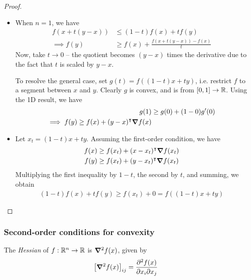 \documentclass{../../template/note}
\begin{document}
    \begin{proof}
        \begin{itemize}
            \item[$\implies$] When $n=1$, we have
            \begin{align*}
                f(x + t(y-x)) &\leq (1-t)f(x) + tf(y) \\
                \implies f(y) &\geq f(x) + \frac{f(x+t(y-x))-f(x)}{t}
            \end{align*}
            Now, take $t \to 0$ -- the quotient becomes $(y-x)$ times the derivative due to the fact that $t$ is scaled by $y-x$.

            To resolve the general case, set $g(t) = f((1-t)x+ty)$, i.e. restrict $f$ to a segment between $x$ and $y$. Clearly $g$ is convex, and is from $[0, 1] \to \mathbb R$. Using the 1D result, we have
            \begin{align*}
                g(1) &\geq g(0) + (1-0)g'(0) \\
                \implies f(y) \geq f(x) + (y-x)^\intercal \grad f(x)
            \end{align*}
            \item[$\impliedby$] Let $x_t = (1-t)x + ty$. Assuming the first-order condition, we have
            \begin{align*}
                f(x) &\geq f(x_t) + (x-x_t)^\intercal \grad f(x_t) \\
                f(y) &\geq f(x_t) + (y-x_t)^\intercal \grad f(x_t)
            \end{align*}
            Multiplying the first inequality by $1-t$, the second by $t$, and summing, we obtain
            \begin{align*}
                (1-t)f(x) + tf(y) \geq f(x_t) + 0 = f((1-t)x + ty)
            \end{align*}            
        \end{itemize}
    \end{proof}
    
    \subsubsection{Second-order conditions for convexity}

    \begin{definition}[Hessian]
        The \emph{Hessian} of $f: \mathbb R^n \to \mathbb R$ is $\grad^2 f(x)$, given by
        \begin{align*}
            \left[\grad^2 f(x)\right]_{ij} = \pd{^2f(x)}{x_i \pr x_j}
        \end{align*}
    \end{definition}
    
\end{document}
